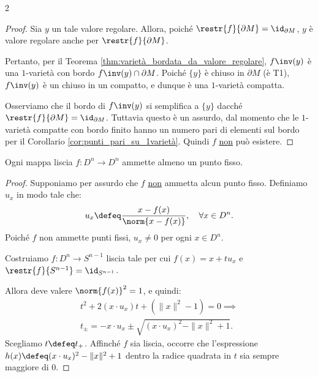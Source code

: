 \begin{multicols*}{2}
\begin{proof}
        Sia $y$ un
        tale valore regolare. Allora, poiché $\restr{f}{\partial M} = \id_{\partial M}$,
        $y$ è valore regolare anche per $\restr{f}{\partial M}$. \smallskip

        Pertanto, per il Teorema \ref{thm:varietà_bordata_da_valore_regolare}, $f\inv(y)$ è una
        $1$-varietà con bordo $f\inv(y) \cap \partial M$. Poiché $\{y\}$ è chiuso in $\partial M$
        (è T1), $f\inv(y)$ è un chiuso in un compatto, e dunque è una $1$-varietà compatta. \smallskip

        Osserviamo che il bordo di $f\inv(y)$ si semplifica a $\{y\}$ dacché $\restr{f}{\partial M} = \id_{\partial M}$. Tuttavia questo
        è un assurdo, dal momento che le $1$-varietà compatte con bordo finito hanno un numero pari di elementi sul
        bordo per il Corollario \ref{cor:punti_pari_su_1varietà}. Quindi $f$ \underline{non} può esistere.
    \end{proof}

    \begin{lemma} \label{lem:punto_fisso_cinf}
        Ogni mappa liscia $f : D^n \to D^n$ ammette almeno un punto fisso.
    \end{lemma}

    \begin{proof}
        Supponiamo per assurdo che $f$ \underline{non} ammetta alcun punto fisso.
        Definiamo $u_x$ in modo tale che:
        \[
            u_x \defeq \frac{x - f(x)}{\norm{x - f(x)}}, \quad \forall x \in D^n.
        \]
        Poiché $f$ non ammette punti fissi, $u_x \neq 0$ per ogni $x \in D^n$. \smallskip

        Costruiamo $f : D^n \to S^{n-1}$ liscia tale per cui $f(x) = x + t u_x$ e
        $\restr{f}{S^{n-1}} = \id_{S^{n-1}}$. \smallskip

        Allora deve valere $\norm{f(x)}^2 = 1$, e quindi:
        \begin{equation*}
            \begin{aligned}
                t^2 + 2(x \cdot u_x) t + (\|x\|^2 - 1) = 0 \implies \\
                t_{\pm} = - x \cdot u_x \pm \sqrt{(x \cdot u_x)^2 - \|x\|^2 + 1}.
            \end{aligned}
        \end{equation*}
        Scegliamo $t \defeq t_+$. Affinché $f$ sia liscia, occorre che l'espressione
        $h(x) \defeq (x \cdot u_x)^2 - \|x\|^2 + 1$ dentro la radice quadrata in $t$ sia sempre maggiore di $0$. \smallskip


\end{proof}
\end{multicols*}
